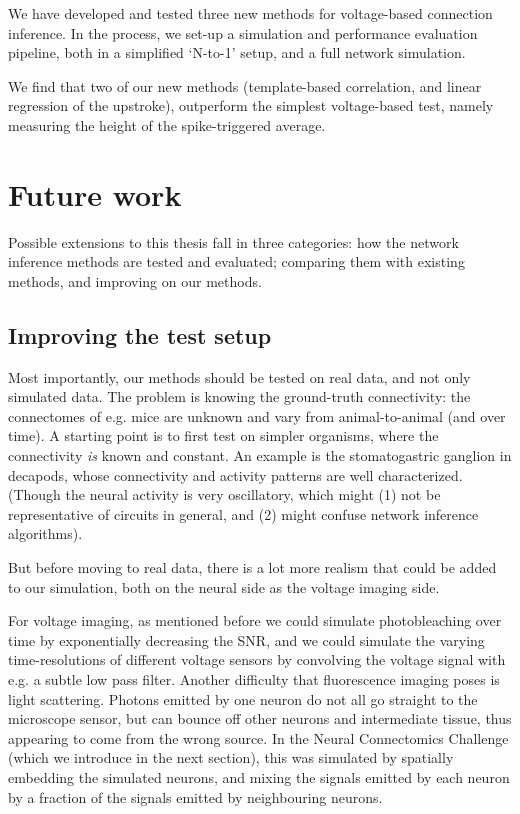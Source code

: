 

We have developed and tested three new methods for voltage-based connection inference.
In the process, we set-up a simulation and performance evaluation pipeline, both in a simplified `N-to-1' setup, and a full network simulation.

We find that two of our new methods (template-based correlation, and linear regression of the upstroke), outperform the simplest voltage-based test, namely measuring the height of the spike-triggered average.



\section{Future work}


Possible extensions to this thesis fall in three categories: how the network inference methods are tested and evaluated; comparing them with existing methods, and improving on our methods.


\subsection{Improving the test setup}

Most importantly, our methods should be tested on real data, and not only simulated data. The problem is knowing the ground-truth connectivity: the connectomes of e.g. mice are unknown and vary from animal-to-animal (and over time).
A starting point is to first test on simpler organisms, where the connectivity \emph{is} known and constant. An example is the stomatogastric ganglion in decapods, whose connectivity and activity patterns are well characterized. (Though the neural activity is very oscillatory, which might (1) not be representative of circuits in general, and (2) might confuse network inference algorithms).

But before moving to real data, there is a lot more realism that could be added to our simulation, both on the neural side as the voltage imaging side.

For voltage imaging, as mentioned before we could simulate photobleaching over time by exponentially decreasing the SNR, and we could simulate the varying time-resolutions of different voltage sensors by convolving the voltage signal with e.g. a subtle low pass filter.
Another difficulty that fluorescence imaging poses is light scattering. Photons emitted by one neuron do not all go straight to the microscope sensor, but can bounce off other neurons and intermediate tissue, thus appearing to come from the wrong source. In the  Neural Connectomics Challenge (which we introduce in the next section), this was simulated by spatially embedding the simulated neurons, and mixing the signals emitted by each neuron by a fraction of the signals emitted by neighbouring neurons.

